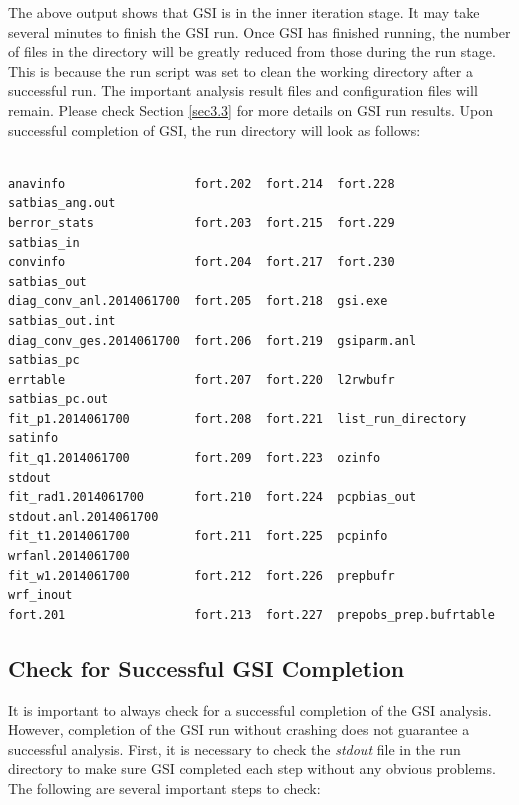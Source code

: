 The above output shows that GSI is in the inner iteration stage.  It may take several minutes to finish the GSI run.  Once GSI has finished running, the number of files in the directory will be greatly reduced from those during the run stage.  This is because the run script was set to clean the working directory after a successful run.  The important analysis result files and configuration files will remain. Please check Section \ref{sec3.3} for more details on GSI run results. Upon successful completion of GSI, the run directory will look as follows:

\begin{scriptsize}
\begin{verbatim}

anavinfo                  fort.202  fort.214  fort.228                satbias_ang.out
berror_stats              fort.203  fort.215  fort.229                satbias_in
convinfo                  fort.204  fort.217  fort.230                satbias_out
diag_conv_anl.2014061700  fort.205  fort.218  gsi.exe                 satbias_out.int
diag_conv_ges.2014061700  fort.206  fort.219  gsiparm.anl             satbias_pc
errtable                  fort.207  fort.220  l2rwbufr                satbias_pc.out
fit_p1.2014061700         fort.208  fort.221  list_run_directory      satinfo
fit_q1.2014061700         fort.209  fort.223  ozinfo                  stdout
fit_rad1.2014061700       fort.210  fort.224  pcpbias_out             stdout.anl.2014061700
fit_t1.2014061700         fort.211  fort.225  pcpinfo                 wrfanl.2014061700
fit_w1.2014061700         fort.212  fort.226  prepbufr                wrf_inout
fort.201                  fort.213  fort.227  prepobs_prep.bufrtable
\end{verbatim}
\end{scriptsize}

\subsection{Check for Successful GSI Completion}
\label{sec5.1.3}

It is important to always check for a successful completion of the GSI analysis. However, completion of the GSI run without crashing does not guarantee a successful analysis.  First, it is necessary to check the \textit{stdout} file in the run directory to make sure GSI completed each step without any obvious problems.  The following are several important steps to check:

